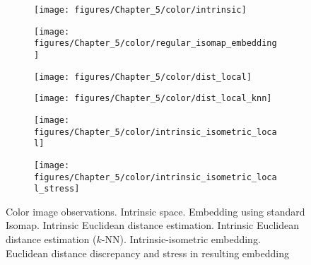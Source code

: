 	\begin{figure}[h]
		\begin{centering}
			\begin{subfigure}[t]{0.47\columnwidth}%
				\texttt{[image: figures/Chapter\_5/color/intrinsic]}
				\caption{\label{fig:3a}}
			\end{subfigure}\hfill
			\begin{subfigure}[t]{0.47\columnwidth}%
				\texttt{[image: figures/Chapter\_5/color/regular\_isomap\_embedding]}
				\caption{\label{fig:3b}}
			\end{subfigure}
		\end{centering}
		\begin{centering}
			\begin{subfigure}[t]{0.47\columnwidth}%
				\texttt{[image: figures/Chapter\_5/color/dist\_local]}
				\caption{\label{fig:3c}}
			\end{subfigure}\hfill
			\begin{subfigure}[t]{0.47\columnwidth}%
				\texttt{[image: figures/Chapter\_5/color/dist\_local\_knn]}
				\caption{\label{fig:3d}}
			\end{subfigure}
		\end{centering}
		\begin{centering}
			\begin{subfigure}[t]{0.47\columnwidth}%
				\texttt{[image: figures/Chapter\_5/color/intrinsic\_isometric\_local]}
				\caption{\label{fig:3e} \label{fig:bend1}}
			\end{subfigure}\hfill
			\begin{subfigure}[t]{0.47\columnwidth}%
				\texttt{[image: figures/Chapter\_5/color/intrinsic\_isometric\_local\_stress]}
				\caption{\label{fig:3f}} 
			\end{subfigure}
		\end{centering}
		\caption{Color image observations\label{fig:Color-image-observations}. 
			\protect{} Intrinsic space. 
			\protect{} Embedding using standard Isomap. 
			\protect{} Intrinsic Euclidean distance estimation. 
			\protect{} Intrinsic Euclidean distance estimation ($k$-NN). 
			\protect{} Intrinsic-isometric embedding. 
			\protect{} Euclidean distance discrepancy and stress in resulting embedding}
	\end{figure}
	
